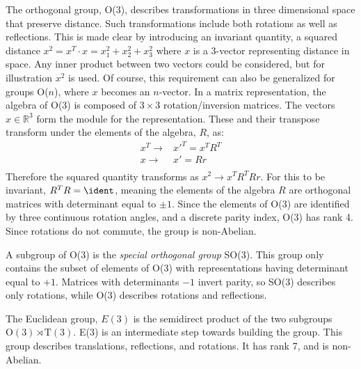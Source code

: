 The orthogonal group, O(3), describes transformations in three dimensional space that preserve distance.
Such transformations include both rotations as well as reflections. 
This is made clear by introducing an invariant quantity, a squared distance $x^2=x^T\cdot x=x_1^2+x_2^2+x_3^2$ where $x$ is a 3-vector representing distance in space. 
Any inner product between two vectors could be considered, but for illustration $x^2$ is used.
Of course, this requirement can also be generalized for groups O($n$), where $x$ becomes an $n$-vector.
In a matrix representation, the algebra of O(3) is composed of $3\times3$ rotation/inversion matrices.
The vectors $x\in\mathbb{R}^3$ form the module for the representation.
These and their transpose transform under the elements of the algebra, $R$, as:
\begin{equation}\begin{split}\label{eqn:oTransform}
    x^T\to&x'^T=x^TR^T \\
    x\to&x'=Rr \\
\end{split}\end{equation}
Therefore the squared quantity transforms as $x^2\to x^TR^TRr$.
For this to be invariant, $R^TR=\ident$, meaning the elements of the algebra $R$ are orthogonal matrices with determinant equal to $\pm1$.
Since the elements of O(3) are identified by three continuous rotation angles, and a discrete parity index, O(3) has rank 4.
Since rotations do not commute, the group is non-Abelian.

A subgroup of O(3) is the \emph{special orthogonal group} SO(3).
This group only contains the subset of elements of O(3) with representations having determinant equal to $+1$.
Matrices with determinants $-1$ invert parity, so SO(3) describes only rotations, while O(3) describes rotations and reflections.

The Euclidean group, $E(3)$ is the semidirect product of the two subgroups $\text{O}(3)\rtimes\text{T}(3)$.
E(3) is an intermediate step towards building the \poincare group.
This group describes translations, reflections, and rotations.
It has rank 7, and is non-Abelian.

